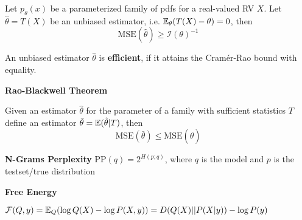 Let \(p_\theta(x)\) be a parameterized family of pdfs for a real-valued RV \(X\). 
Let \(\hat{\theta} = T(X)\) be an unbiased estimator, i.e. \(\mathbb{E}_\theta(T(X)- \theta) = 0\), then 
\[\text{MSE}(\hat{\theta}) \geq \mathcal{I}(\theta)^{-1}\]

An unbiased estimator \(\hat{\theta}\) is \textbf{efficient}, if it attains the Cramér-Rao bound with equality.

\textbf{Rao-Blackwell Theorem}

Given an estimator \(\hat{\theta}\) for the parameter of a family with sufficient statistics \(T\) define an estimator
\(\bar{\theta} = \mathbb{E}(\hat{\theta} | T)\), then 
\[\text{MSE}(\bar{\theta}) \leq \text{MSE}(\hat{\theta})\]

\textbf{N-Grams Perplexity}
\(\text{PP}(q) = 2^{H(p;q)}\), where \(q\) is the model and \(p\) is the testset/true distribution

\textbf{Free Energy} 

\(\mathcal{F}(Q, y) = \mathbb{E}_Q(\log Q(X) - \log P(X, y)) = D(Q(X)||P(X|y)) - \log P(y)\)